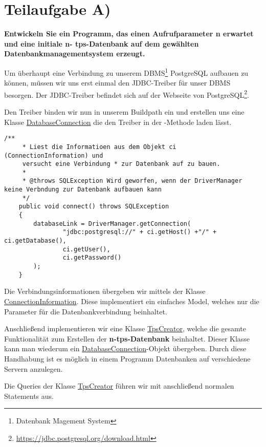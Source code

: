 \section{Teilaufgabe A)}
\textbf{Entwickeln Sie ein Programm, das einen Aufrufparameter n erwartet und eine initiale n-
tps-Datenbank auf dem gewählten Datenbankmanagementsystem erzeugt.}

Um überhaupt eine Verbindung zu unserem DBMS\footnote{Datenbank Magement
System} PostgreSQL aufbauen zu können, müssen wir uns erst einmal den
JDBC-Treiber für unser DBMS besorgen. Der JDBC-Treiber befindet sich auf der
Webseite von PostgreSQL\footnote{\url{https://jdbc.postgresql.org/download.html}}.

Den Treiber binden wir nun in unserem Buildpath ein und erstellen
uns eine Klasse \hyperref[lst:dbv2]{DatabaseConnection} die den Treiber in der
-Methode laden lässt.

\begin{lstlisting}[caption={connect Funktion}]
	/**
	 * Liest die Informatioen aus dem Objekt ci (ConnectionInformation) und
	 versucht eine Verbindung * zur Datenbank auf zu bauen.
	 * 
	 * @throws SQLException Wird geworfen, wenn der DriverManager keine Verbndung zur Datenbank aufbauen kann
	 */
	public void connect() throws SQLException
	{
		databaseLink = DriverManager.getConnection(
				"jdbc:postgresql://" + ci.getHost() +"/" + ci.getDatabase(),
				ci.getUser(), 
				ci.getPassword()
		);
	}
\end{lstlisting}

Die Verbindungsinformationen übergeben wir mittels der Klasse
\hyperref[lst:civ2]{ConnectionInformation}. Diese implementiert ein einfaches
Model, welches nur die Parameter für die Datenbankverbindung beinhaltet.

Anschließend implementieren wir eine Klasse \hyperref[lst:tpsv2]{TpsCreator},
welche die gesamte Funktionalität zum Erstellen der \textbf{n-tps-Datenbank} beinhaltet.
Dieser Klasse kann man wiederum ein
\hyperref[lst:dbv2]{DatabaseConnection}-Objekt übergeben. Durch diese Handhabung
ist es möglich in einem Programm Datenbanken auf verschiedene Servern anzulegen.

Die Queries der Klasse \hyperref[lst:tpsv2]{TpsCreator}
führen wir mit anschließend normalen Statements aus. 


